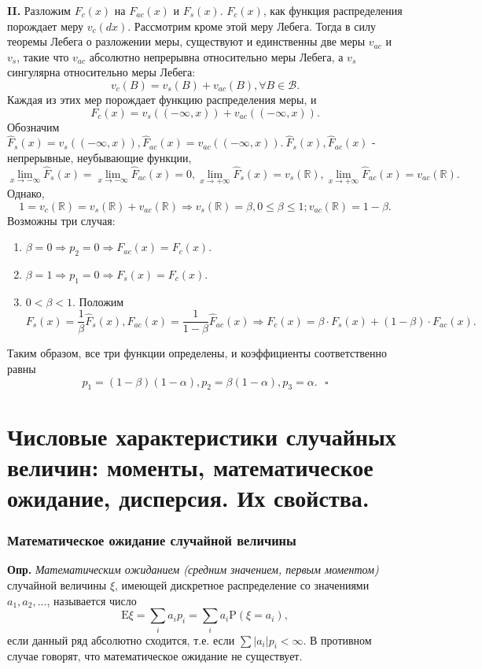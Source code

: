 \documentclass[oneside,final,14pt]{extreport}
\newcommand\mydef{{\bf Опр.}}
\theoremstyle{definition}
\begin{document}
\textbf{II.} Разложим $F_c(x)$ на $F_{ac}(x)$ и $F_s(x).$ $F_c(x)$, как функция распределения порождает меру $v_{c}(dx).$ Рассмотрим кроме этой меру Лебега. Тогда в силу теоремы Лебега о разложении меры, существуют и единственны две меры $v_{ac}$ и $v_s$, такие что $v_{ac}$ абсолютно непрерывна относительно меры Лебега, а $v_s$ сингулярна относительно меры Лебега:
$$ v_c(B) = v_s(B) + v_{ac}(B), \forall B \in \mathcal{B}. $$
Каждая из этих мер порождает функцию распределения меры, и $$F_{c}(x)=v_{s}((-\infty, x))+v_{a c}((-\infty, x)).$$
Обозначим $\hat{F}_{s}(x)=v_{s}((-\infty, x)), \hat{F}_{a c}(x)=v_{a c}((-\infty, x)).~ \hat{F}_{s}(x), \hat{F}_{a c}(x)$ - непрерывные, неубывающие функции, $$\lim\limits_{x \rightarrow-\infty} \hat{F}_{s}(x)=\lim\limits_{x \rightarrow-\infty} \hat{F}_{a c}(x)=0, \lim\limits_{x \rightarrow+\infty} \hat{F}_{s}(x)=v_{s}(\mathbb{R}), \lim\limits_{x \rightarrow+\infty} \hat{F}_{a c}(x)=v_{a c}(\mathbb{R}).$$
Однако, $$1=v_{c}(\mathbb{R})=v_{s}(\mathbb{R})+v_{a c}(\mathbb{R}) \Rightarrow v_{s}(\mathbb{R})=\beta, 0 \leq \beta \leq 1 ; v_{a c}(\mathbb{R})=1-\beta.$$
Возможны три случая:
\begin{enumerate}
    \item $\beta=0 \Rightarrow p_{2}=0 \Rightarrow F_{a c}(x)=F_{c}(x).$
    \item $\beta=1 \Rightarrow p_{1}=0 \Rightarrow F_{s}(x)=F_{c}(x).$
    \item $0 < \beta < 1.$ Положим
    $$F_{s}(x)=\frac{1}{\beta} \hat{F}_{s}(x), F_{a c}(x)=\frac{1}{1-\beta} \hat{F}_{a c}(x) \Rightarrow F_{c}(x)=\beta \cdot F_{s}(x)+(1-\beta) \cdot F_{a c}(x).$$
\end{enumerate}
Таким образом, все три функции определены, и коэффициенты соответственно равны
$$p_1 = (1 - \beta)(1 - \alpha), p_2 = \beta(1 - \alpha), p_3 = \alpha. ~~~ \square$$

\section{Числовые характеристики случайных величин: моменты, математическое ожидание, дисперсия. Их свойства.}

\subsubsection{Математическое ожидание случайной величины}

\mydef{} {\it Математическим ожиданием (средним значением, первым моментом)} случайной величины $\xi$, имеющей дискретное распределение со значениями $a_1, a_2, ...$, называется число
$$\mathrm{E} \xi=\sum_{i} a_{i} p_{i}=\sum_{i} a_{i} \mathrm{P}\left(\xi=a_{i}\right),$$
если данный ряд абсолютно сходится, т.е. если $\sum |a_i|p_i < \infty.$ В противном случае говорят, что математическое ожидание не существует.
\end{document}
